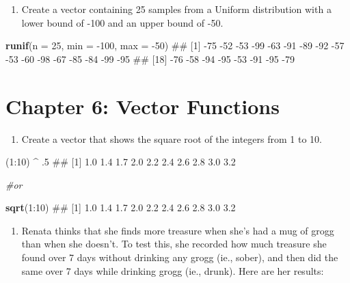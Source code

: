 \documentclass[]{book}
\newenvironment{Shaded}{\begin{snugshade}}{\end{snugshade}}
\newcommand{\KeywordTok}[1]{\textcolor[rgb]{0.13,0.29,0.53}{\textbf{{#1}}}}
\newcommand{\DataTypeTok}[1]{\textcolor[rgb]{0.13,0.29,0.53}{{#1}}}
\newcommand{\DecValTok}[1]{\textcolor[rgb]{0.00,0.00,0.81}{{#1}}}
\newcommand{\StringTok}[1]{\textcolor[rgb]{0.31,0.60,0.02}{{#1}}}
\newcommand{\CommentTok}[1]{\textcolor[rgb]{0.56,0.35,0.01}{\textit{{#1}}}}
\newcommand{\NormalTok}[1]{{#1}}
\providecommand{\tightlist}{%
  \setlength{\itemsep}{0pt}\setlength{\parskip}{0pt}}
\theoremstyle{definition}
\theoremstyle{definition}
\theoremstyle{remark}
\begin{document}
\begin{enumerate}
\def\labelenumi{\arabic{enumi}.}
\setcounter{enumi}{8}
\tightlist
\item
  Create a vector containing 25 samples from a Uniform distribution with
  a lower bound of -100 and an upper bound of -50.
\end{enumerate}

\begin{Shaded}
\begin{Highlighting}[]
\KeywordTok{runif}\NormalTok{(}\DataTypeTok{n =} \DecValTok{25}\NormalTok{, }\DataTypeTok{min =} \NormalTok{-}\DecValTok{100}\NormalTok{, }\DataTypeTok{max =} \NormalTok{-}\DecValTok{50}\NormalTok{)}
\NormalTok{##  [1] -75 -52 -53 -99 -63 -91 -89 -92 -57 -53 -60 -98 -67 -85 -84 -99 -95}
\NormalTok{## [18] -76 -58 -94 -95 -53 -91 -95 -79}
\end{Highlighting}
\end{Shaded}

\section{Chapter 6: Vector Functions}\label{chapter-6-vector-functions}

\begin{enumerate}
\def\labelenumi{\arabic{enumi}.}
\tightlist
\item
  Create a vector that shows the square root of the integers from 1 to
  10.
\end{enumerate}

\begin{Shaded}
\begin{Highlighting}[]
\NormalTok{(}\DecValTok{1}\NormalTok{:}\DecValTok{10}\NormalTok{) ^}\StringTok{ }\NormalTok{.}\DecValTok{5}
\NormalTok{##  [1] 1.0 1.4 1.7 2.0 2.2 2.4 2.6 2.8 3.0 3.2}

\CommentTok{#or}

\KeywordTok{sqrt}\NormalTok{(}\DecValTok{1}\NormalTok{:}\DecValTok{10}\NormalTok{)}
\NormalTok{##  [1] 1.0 1.4 1.7 2.0 2.2 2.4 2.6 2.8 3.0 3.2}
\end{Highlighting}
\end{Shaded}

\begin{enumerate}
\def\labelenumi{\arabic{enumi}.}
\setcounter{enumi}{1}
\tightlist
\item
  Renata thinks that she finds more treasure when she's had a mug of
  grogg than when she doesn't. To test this, she recorded how much
  treasure she found over 7 days without drinking any grogg (ie.,
  sober), and then did the same over 7 days while drinking grogg (ie.,
  drunk). Here are her results:
\end{enumerate}
\end{document}
